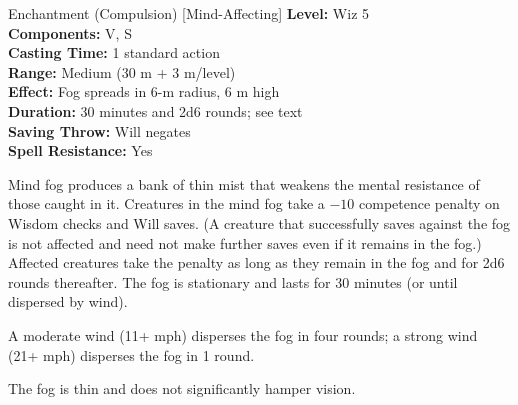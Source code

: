 {Enchantment (Compulsion) [Mind-Affecting]}
{
	\textbf{Level:}
	Wiz 5\\
	\textbf{Components:}
	V, S\\
	\textbf{Casting Time:}
	1 standard action\\
	\textbf{Range:}
	Medium (30 m + 3 m/level)\\
	\textbf{Effect:}
	Fog spreads in 6-m radius, 6 m high\\
	\textbf{Duration:}
	30 minutes and 2d6 rounds; see text\\
	\textbf{Saving Throw:}
	Will negates\\
	\textbf{Spell Resistance:}
	Yes\\
}
{
	Mind fog produces a bank of thin mist that weakens the mental resistance of those caught in it. Creatures in the mind fog take a $-10$ competence penalty on Wisdom checks and Will saves. (A creature that successfully saves against the fog is not affected and need not make further saves even if it remains in the fog.) Affected creatures take the penalty as long as they remain in the fog and for 2d6 rounds thereafter. The fog is stationary and lasts for 30 minutes (or until dispersed by wind).

	A moderate wind (11+ mph) disperses the fog in four rounds; a strong wind (21+ mph) disperses the fog in 1 round.

	The fog is thin and does not significantly hamper vision.

}
